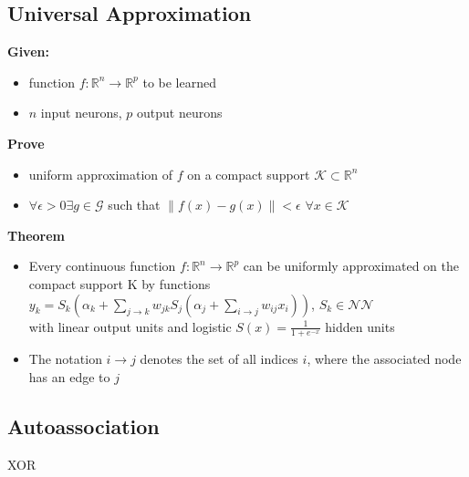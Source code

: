 \documentclass[main]{subfiles}
\begin{document}
\subsection{Universal Approximation}
\textbf{Given:}\\ \begin{itemize}
\item function $f: \mathbb{R}^n \to \mathbb{R}^p$ to be learned
\item  $n$ input neurons, $p$ output neurons
\end{itemize}
\textbf{Prove}
\begin{itemize}
\item uniform approximation of $f$ on a compact support $\mathcal{K} \subset \mathbb{R}^n$
\item $\forall \epsilon  >0 \exists g \in \mathcal{G} $ such that $\lVert f(x)-g(x) \rVert<\epsilon$ \space\space $\forall x \in \mathcal{K}$
\end{itemize}
\textbf{Theorem}
\begin{itemize}
\item Every continuous function $f: \mathbb{R}^n \to \mathbb{R}^p$ can be uniformly approximated on the compact support K
by functions\\
$y_k=S_k(\alpha_k+\sum_{j\to k}w_{jk}S_j(\alpha_j+\sum_{i\to j}w_{ij}x_i))$, $S_k \in \mathcal{N}\mathcal{N}$\\
with linear output units and logistic $S(x)=\frac{1}{1+e^{-x}}$ hidden units
\item The notation $i \to j$ denotes the set of all
indices $i$, where the associated node has an edge to $j$
\end{itemize}

\subsection{Autoassociation}
XOR

\end{document}
